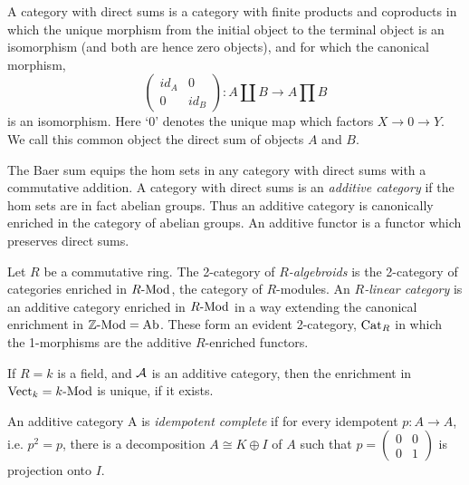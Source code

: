 \documentclass{amsart}
\begin{document}
A category with direct sums is a category with finite products and coproducts in which the unique morphism from the initial object to the terminal object is an isomorphism (and both are hence zero objects), and for which the canonical morphism,
\begin{equation*}
	\left( \begin{array}{cc} id_A & 0 \\ 0 & id_B \end{array}\right) : A \coprod B \to A \prod B
\end{equation*}
is an isomorphism.  Here `0' denotes the unique map which factors $X \to 0 \to Y$. We call this common object the direct sum of objects $A$ and $B$.

The Baer sum equips the hom sets in any category with direct sums with a commutative addition. A category with direct sums is an {\em additive category} if the hom sets are in fact abelian groups. Thus an additive category is canonically enriched in the category of abelian groups. An additive functor is a functor which preserves direct sums. 

\begin{definition}
	Let $R$ be a commutative ring. The 2-category of {\em $R$-algebroids} is the 2-category of categories enriched in $\Mod{R}{}$, the category of $R$-modules. An {\em $R$-linear category} is an additive category enriched in $\Mod{R}{}$ in a way extending the canonical enrichment in $\Mod{\ZZ}{} = \Ab$. These form an evident 2-category, $\mathrm{Cat}_R$ in which the 1-morphisms are the additive $R$-enriched functors. 
\end{definition}

\begin{remark}
	If $R = k$ is a field, and $\mathcal A$ is an additive category, then the enrichment in $\Vect_k = \Mod{k}{}$ is unique, if it exists. 
\end{remark}

\begin{definition}
	An additive category A is {\em idempotent complete} \cite[1.2.1, 1.2.2]{Karoubi68} if for
	every idempotent $p: A \to A$, i.e. $p^2 = p$, there is a decomposition $A \cong K \oplus I$ of $A$ such that $p = \left( \begin{array}{cc} 0 & 0 \\ 0 & 1 \end{array}\right)$ is projection onto $I$. 
\end{definition}
\end{document}
